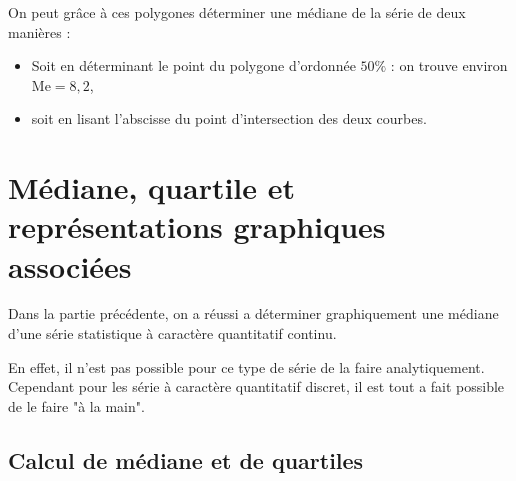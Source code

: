 \documentclass[10pt,a4paper,openany,twoside, eleve]{book}
\begin{document}
\begin{ex}{}{}
\begin{center}
   \end{center}
   On peut grâce à ces polygones déterminer une médiane de la série de deux manières :
   \begin{itemize}
      \item  Soit en  déterminant le point du polygone d'ordonnée $50\%$ : on trouve environ $\text{Me} =8,2$,
      \item  soit en lisant l'abscisse du point d'intersection des deux courbes.
   \end{itemize}
\end{ex}

\section{Médiane, quartile et représentations graphiques associées} \label{Eff_Med}

Dans la partie précédente, on a réussi a déterminer graphiquement une médiane d'une série statistique à caractère quantitatif continu.

En effet, il n'est pas possible pour ce type de série de la faire analytiquement. Cependant pour les série à caractère quantitatif discret, il est tout a fait possible de le faire "à la main".

\subsection{Calcul de médiane et de quartiles}
\end{document}
